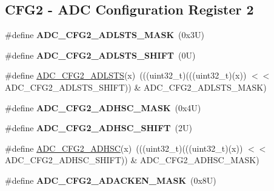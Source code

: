 \subsection*{C\+F\+G2 -\/ A\+DC Configuration Register 2}
\begin{DoxyCompactItemize}
\item 
\mbox{\label{group___a_d_c___register___masks_ga99f0b4983922eca1e6ed86d053fe41db}} 
\#define {\bfseries A\+D\+C\+\_\+\+C\+F\+G2\+\_\+\+A\+D\+L\+S\+T\+S\+\_\+\+M\+A\+SK}~(0x3\+U)
\item 
\mbox{\label{group___a_d_c___register___masks_ga8d39dceb9fa2550294f0623cc1fbc3f3}} 
\#define {\bfseries A\+D\+C\+\_\+\+C\+F\+G2\+\_\+\+A\+D\+L\+S\+T\+S\+\_\+\+S\+H\+I\+FT}~(0\+U)
\item 
\#define \mbox{\hyperlink{group___a_d_c___register___masks_gae23653c06f0dfe00b27a15ef15138c8e}{A\+D\+C\+\_\+\+C\+F\+G2\+\_\+\+A\+D\+L\+S\+TS}}(x)~(((uint32\+\_\+t)(((uint32\+\_\+t)(x)) $<$$<$ A\+D\+C\+\_\+\+C\+F\+G2\+\_\+\+A\+D\+L\+S\+T\+S\+\_\+\+S\+H\+I\+FT)) \& A\+D\+C\+\_\+\+C\+F\+G2\+\_\+\+A\+D\+L\+S\+T\+S\+\_\+\+M\+A\+SK)
\item 
\mbox{\label{group___a_d_c___register___masks_ga73cb928c5cacb18e02a3f0d67dcf1e6f}} 
\#define {\bfseries A\+D\+C\+\_\+\+C\+F\+G2\+\_\+\+A\+D\+H\+S\+C\+\_\+\+M\+A\+SK}~(0x4\+U)
\item 
\mbox{\label{group___a_d_c___register___masks_ga447389268d77124eb2012fd98bfe07ce}} 
\#define {\bfseries A\+D\+C\+\_\+\+C\+F\+G2\+\_\+\+A\+D\+H\+S\+C\+\_\+\+S\+H\+I\+FT}~(2\+U)
\item 
\#define \mbox{\hyperlink{group___a_d_c___register___masks_ga450ab5053af7a32f369bc1436b35d7f5}{A\+D\+C\+\_\+\+C\+F\+G2\+\_\+\+A\+D\+H\+SC}}(x)~(((uint32\+\_\+t)(((uint32\+\_\+t)(x)) $<$$<$ A\+D\+C\+\_\+\+C\+F\+G2\+\_\+\+A\+D\+H\+S\+C\+\_\+\+S\+H\+I\+FT)) \& A\+D\+C\+\_\+\+C\+F\+G2\+\_\+\+A\+D\+H\+S\+C\+\_\+\+M\+A\+SK)
\item 
\mbox{\label{group___a_d_c___register___masks_ga1158034a83b78e238c3f8ca481ab9b27}} 
\#define {\bfseries A\+D\+C\+\_\+\+C\+F\+G2\+\_\+\+A\+D\+A\+C\+K\+E\+N\+\_\+\+M\+A\+SK}~(0x8\+U)
\item 

\end{DoxyCompactItemize}
